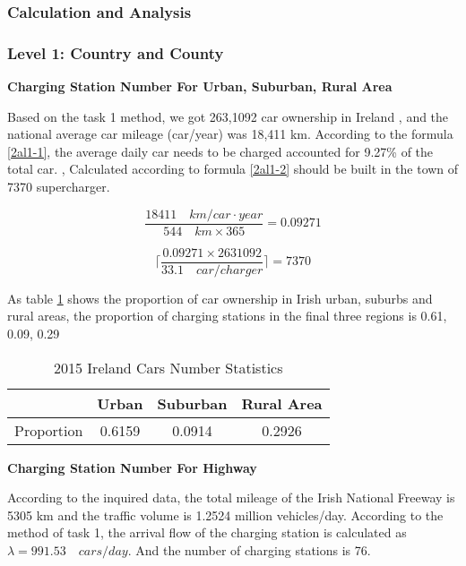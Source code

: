 \documentclass{mcmthesis}
\begin{document}
\subsubsection{Calculation and Analysis}

\subsubsection*{Level 1: Country and County}

\textbf{Charging Station Number For Urban, Suburban, Rural Area}

\par Based on the task 1 method, we got 263,1092 car ownership in Ireland , and the national average car mileage (car/year) was 18,411 km. According to the formula \ref{2al1-1}, the average daily car needs to be charged accounted for 9.27\% of the total car. , Calculated according to formula \ref{2al1-2} should be built in the town of 7370 supercharger. 

\begin{equation}
	\label{2al1-1}
	\frac{18411 \quad km/car \cdot year}{544 \quad km \times 365} = 0.09271 
\end{equation}

\begin{equation}
	\label{2al1-2}
	\lceil \frac{0.09271 \times 2631092}{33.1 \quad car/charger} \rceil= 7370
\end{equation}

\par As table \ref{tab:2015 Ireland Cars Number Statistics} shows the proportion of car ownership in Irish urban, suburbs and rural areas, the proportion of charging stations in the final three regions is 0.61, 0.09, 0.29

\begin{table}[h]
\centering
\caption{2015 Ireland Cars Number Statistics}\label{tab:2015 Ireland Cars Number Statistics}
\begin{tabular}{c|ccc}
\toprule
 & Urban & Suburban & Rural Area\\
\midrule
Proportion & 0.6159 & 0.0914 & 0.2926 \\
\bottomrule
\end{tabular}
\end{table}
      

\textbf{Charging Station Number For Highway}

\par According to the inquired data, the total mileage of the Irish National Freeway is 5305 km and the traffic volume is 1.2524 million vehicles/day. According to the method of task 1, the arrival flow of the charging station is calculated as $ \lambda = 991.53 \quad cars/day $. And the number of charging stations is 76.
\end{document}
